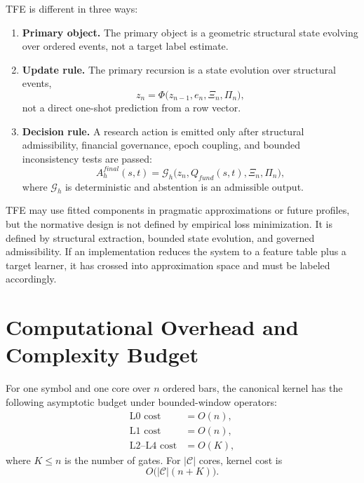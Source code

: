 TFE is different in three ways:
\begin{enumerate}[leftmargin=1.2cm]
    \item \textbf{Primary object.} The primary object is a geometric structural state evolving over ordered events, not a target label estimate.
    \item \textbf{Update rule.} The primary recursion is a state evolution over structural events,
    \[
    z_n = \Phi\big(z_{n-1}, e_n, \Xi_n, \Pi_n\big),
    \]
    not a direct one-shot prediction from a row vector.
    \item \textbf{Decision rule.} A research action is emitted only after structural admissibility, financial governance, epoch coupling, and bounded inconsistency tests are passed:
    \[
    A_h^{final}(s,t)=\mathcal{G}_h\big(z_n,Q_{fund}(s,t),\Xi_n,\Pi_n\big),
    \]
    where $\mathcal{G}_h$ is deterministic and abstention is an admissible output.
\end{enumerate}

TFE may use fitted components in pragmatic approximations or future profiles, but the normative design is not defined by empirical loss minimization. It is defined by structural extraction, bounded state evolution, and governed admissibility. If an implementation reduces the system to a feature table plus a target learner, it has crossed into approximation space and must be labeled accordingly.

\section{Computational Overhead and Complexity Budget}

For one symbol and one core over $n$ ordered bars, the canonical kernel has the following asymptotic budget under bounded-window operators:
\begin{align*}
\text{L0 cost} &= O(n),\\
\text{L1 cost} &= O(n),\\
\text{L2--L4 cost} &= O(K),
\end{align*}
where $K\le n$ is the number of gates. For $|\mathcal{C}|$ cores, kernel cost is
\[
O\big(|\mathcal{C}|(n+K)\big).
\]

